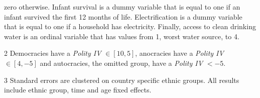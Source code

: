 \begin{table}[!h]
{\begin{threeparttable}
\begin{tablenotes}
{                      zero otherwise. Infant survival is a dummy variable that is equal to one if an infant 
                      survived the first 12 months of life. Electrification is a dummy variable that is equal 
                      to one if a household has electricity. Finally, access to clean drinking water is an 
                      ordinal variable that has values from 1, worst water source, to 4.}
\item[2] Democracies have a \textit{Polity IV } $\in [10, 5]$, anocracies have a \textit{Polity IV } 
                      $\in [4, -5]$ and autocracies, the omitted group, have a \textit{Polity IV } $<-5$.
\item[3] \footnotesize{Standard errors are clustered on country specific ethnic groups. All 
                      results include ethnic group, time and age fixed effects.}
\end{tablenotes}
\end{threeparttable}}
\end{table}
